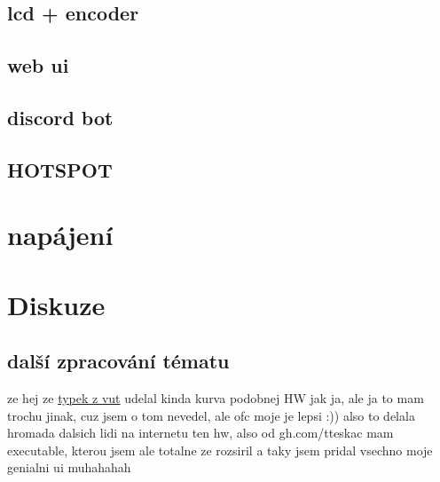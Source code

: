 \documentclass{template/socthesis}
\begin{document}
\section{lcd + encoder}
\section{web ui}
\section{discord bot}
\section{HOTSPOT}

\chapter{napájení}

\chapter{Diskuze}
\section{další zpracování tématu}
ze hej ze \href{https://dspace.vutbr.cz/bitstream/handle/11012/38621/final-thesis.pdf?sequence=-1}{typek z vut} udelal kinda kurva podobnej HW jak ja, ale ja to mam trochu jinak, cuz jsem o tom nevedel, ale ofc moje je lepsi :))
also to delala hromada dalsich lidi na internetu ten hw, also od gh.com/tteskac mam executable, kterou jsem ale totalne ze rozsiril a taky jsem pridal vsechno moje genialni ui muhahahah
\end{document}
